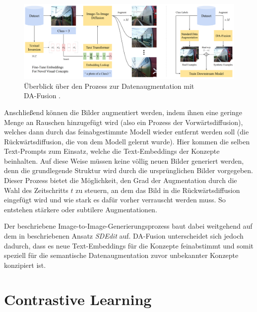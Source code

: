 \begin{figure}[t]
	\centering
	\includegraphics[width=\textwidth]{images/figure_da-fusion_architecture.png}
	\caption[Überblick über den Prozess zur Datenaugmentation mit DA-Fusion.]{Überblick über den Prozess zur Datenaugmentation mit\\
	DA-Fusion \parencite{Trabucco2023dafusion}.}
	\label{fig:da-fusion-process}
\end{figure}

Anschließend können die Bilder augmentiert werden, indem ihnen eine geringe Menge an Rauschen hinzugefügt wird (also ein Prozess der Vorwärtsdiffusion), welches dann durch das feinabgestimmte Modell wieder entfernt werden soll (die Rückwärtsdiffusion, die von dem Modell gelernt wurde). Hier kommen die selben Text-Prompts zum Einsatz, welche die Text-Embeddings der Konzepte beinhalten. Auf diese Weise müssen keine völlig neuen Bilder generiert werden, denn die grundlegende Struktur wird durch die ursprünglichen Bilder vorgegeben. Dieser Prozess bietet die Möglichkeit, den Grad der Augmentation durch die Wahl des Zeitschritts $t$ zu steuern, an dem das Bild in die Rückwärtsdiffusion eingefügt wird und wie stark es dafür vorher verrauscht werden muss. So entstehen stärkere oder subtilere Augmentationen.

Der beschriebene Image-to-Image-Generierungsprozess baut dabei weitgehend auf dem in \parencite{Meng2022sdedit} beschriebenen Ansatz \emph{SDEdit} auf. DA-Fusion unterscheidet sich jedoch dadurch, dass es neue Text-Embeddings für die Konzepte feinabstimmt und somit speziell für die semantische Datenaugmentation zuvor unbekannter Konzepte konzipiert ist.


\section{Contrastive Learning} \label{sec:contrastive-learning}

